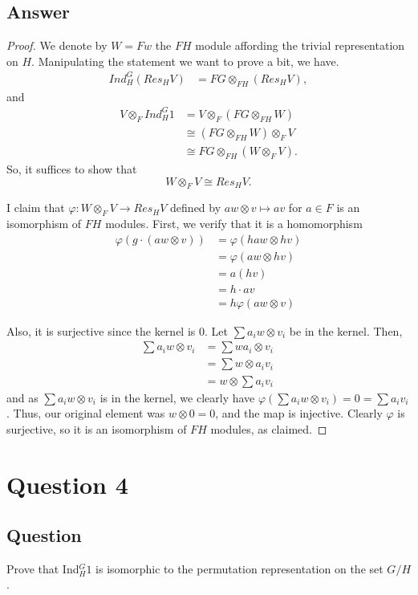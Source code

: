 \documentclass[11pt]{article}
\begin{document}
\subsection{Answer}
\begin{proof}
We denote by $W = Fw$ the $FH$ module affording the trivial representation on $H$.
Manipulating the statement we want to prove a bit, we have.
\begin{align*}
Ind_H^G(Res_H V) &= FG \otimes_{FH} ( Res_H V),
\end{align*}
and
\begin{align*}
V \otimes_F Ind_H^G 1 &= V \otimes_F(FG \otimes_{FH} W)\\
&\cong (FG \otimes_{FH} W) \otimes_F V\\
&\cong FG \otimes_{FH} (W \otimes_F V) .
\end{align*}
So, it suffices to show that
\[W\otimes_F V \cong Res_H V.\]

I claim that $\varphi: W \otimes_F V \to Res_H V$ defined by $a w \otimes v \mapsto av$ for $a \in F$  is an isomorphism of $FH$ modules. First, we verify that it is a homomorphism
\begin{align*}
\varphi(g \cdot (aw \otimes v)) &= \varphi(haw \otimes hv)\\
&= \varphi(a w \otimes hv)\\
&= a(  hv)\\
&= h \cdot av\\
&= h \varphi (aw \otimes v)
\end{align*}

Also, it is surjective since the kernel is 0. Let $\sum a_i w \otimes v_i$ be in the kernel. Then, 
\begin{align*}
\sum a_i w \otimes v_i &= \sum w a_i \otimes v_i\\
&= \sum w \otimes a_i v_i\\
&= w \otimes \sum a_i v_i\
\end{align*}
and as $\sum a_i w \otimes v_i$ is in the kernel, we clearly have $\varphi(\sum a_i w \otimes v_i) = 0 = \sum a_i v_i $. Thus, our original element was $w \otimes 0 = 0$, and the map is injective. Clearly $\varphi$ is surjective, so it is an isomorphism of $FH$ modules, as claimed.
\end{proof}

\section{Question 4}
\subsection{Question}
Prove that Ind$^G_H 1$ is isomorphic to the permutation representation on the set $G/H$.
\end{document}
